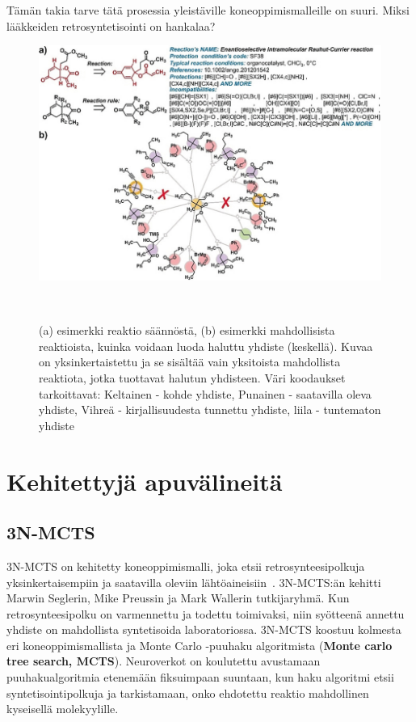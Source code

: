 \documentclass[finnish,twoside,censored,tkt,sw-line]{HYthesisML}
\begin{document}
Tämän takia tarve tätä prosessia yleistäville koneoppimismalleille on suuri.
Miksi lääkkeiden retrosyntetisointi on hankalaa?~\cite{ButlerKeithT2018Mlfm,deAlmeidaA.Filipa2019Socd}
\begin{figure}
    \centering
    \includegraphics[width=\textwidth]{retrosynthesis.jpg}
    \caption{(a) esimerkki reaktio säännöstä, (b) esimerkki mahdollisista reaktioista, kuinka voidaan luoda haluttu yhdiste (keskellä).
        Kuvaa on yksinkertaistettu ja se sisältää vain yksitoista mahdollista reaktiota, jotka tuottavat halutun yhdisteen.
        Väri koodaukset tarkoittavat: Keltainen - kohde yhdiste, Punainen - saatavilla oleva yhdiste, Vihreä - kirjallisuudesta tunnettu yhdiste, liila - tuntematon yhdiste}
    ~\cite{ExpertKnowledgeRetorsynthesis}
\end{figure}

\section{Kehitettyjä apuvälineitä}

\subsection{3N-MCTS}

3N-MCTS on kehitetty koneoppimismalli, joka etsii retrosynteesipolkuja yksinkertaisempiin ja saatavilla oleviin lähtöaineisiin~\cite{SeglerMarwinHS2018Pcsw}.
3N-MCTS:än kehitti Marwin Seglerin, Mike Preussin ja Mark Wallerin tutkijaryhmä.
Kun retrosynteesipolku on varmennettu ja todettu toimivaksi, niin syötteenä annettu yhdiste on mahdollista syntetisoida laboratoriossa.
3N-MCTS koostuu kolmesta eri koneoppimismallista ja Monte Carlo -puuhaku algoritmista (\textbf{Monte carlo tree search, MCTS}).
Neuroverkot on koulutettu avustamaan puuhakualgoritmia etenemään fiksuimpaan suuntaan, kun haku algoritmi etsii syntetisointipolkuja ja tarkistamaan, onko ehdotettu reaktio mahdollinen kyseisellä molekyylille.
\end{document}
